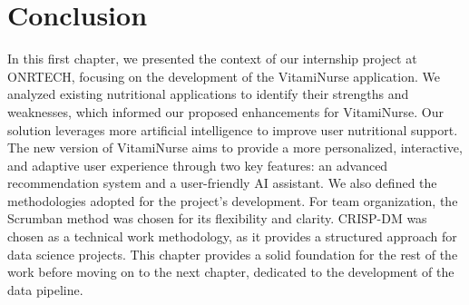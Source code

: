 \section*{Conclusion}
In this first chapter, we presented the context of our internship project
at ONRTECH, focusing on the development of the VitamiNurse application. We analyzed existing nutritional applications to identify their
strengths and weaknesses, which informed our proposed enhancements
for VitamiNurse. Our solution leverages more artificial intelligence to
improve user nutritional support. The new version of VitamiNurse aims
to provide a more personalized, interactive, and adaptive user experience
through two key features: an advanced recommendation system and a
user-friendly AI assistant.
We also defined the methodologies adopted for the project’s development.
For team organization, the Scrumban method was chosen for its flexibility
and clarity. CRISP-DM was chosen as a technical work methodology, as
it provides a structured approach for data science projects.
This chapter provides a solid foundation for the rest of the work before
moving on to the next chapter, dedicated to the development of the data
pipeline.